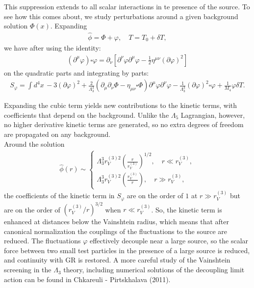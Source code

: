 \documentclass{book}
\theoremstyle{definition}
\newcommand{\p}{\partial}
\newcommand{\f}[2]{\frac{#1}{#2}}
\newcommand{\lp}{\left(}
\newcommand{\rp}{\right)}
\newcommand{\lb}{\left[}
\newcommand{\rb}{\right]}
\begin{document}
This suppression extends to all scalar interactions in te presence of the source. To see how this comes about, we study perturbations around a given background solution $\Phi(x)$. Expanding
\begin{align}
\hat{\phi} = \Phi + \varphi, \quad T = T_0 + \delta T,
\end{align}
we have after using the identity:
\begin{align}
(\p^\mu \varphi)\square \varphi = \p_\nu \lb \p^\nu \varphi \p^\mu \varphi - \f{1}{2} \eta^{\mu\nu}(\p \varphi)^2 \rb
\end{align}
on the quadratic parts and integrating by parts:
\begin{align}
S_\varphi = \int d^4x\, -3(\p \varphi)^2 + \f{2}{\Lambda_3^3}\lp \p_\mu \p_\nu \Phi - \eta_{\mu\nu}\square \Phi \rp\p^\mu \varphi \p^\nu \varphi - \f{1}{\Lambda_3^3}(\p \varphi)^2\square \varphi + \f{1}{M_4}\varphi \delta T.
\end{align}

Expanding the cubic term yields new contributions to the kinetic terms, with coefficients that depend on the background. Unlike the $\Lambda_5$ Lagrangian, however, no higher derivative kinetic terms are generated, so no extra degrees of freedom are propagated on any background.\\

Around the solution 
\begin{align}
\hat{\phi}(r) \sim \begin{cases}
\Lambda_3^3 r_V^{(3)2}\lp \f{r}{r_V^{(3)}}\rp^{1/2},\quad r \ll r_V^{(3)},\\
\Lambda_3^3 r_V^{(3)2}\lp \f{r_V^{(3)}}{r}  \rp,\quad r \gg r_V^{(3)},
\end{cases}
\end{align}
the coefficients of the kinetic term in $S_\varphi$ are on the order of $1$ at $r \gg r_V^{(3)}$ but are on the order of $(r_V^{(3)}/r)^{3/2}$ when $r\ll r_V^{(3)}$. So, the kinetic term is enhanced at distances below the Vainshtein radius, which means that after canonical normalization the couplings of the fluctuations to the source are reduced. The fluctuations $\varphi$ effectively decouple near a large source, so the scalar force between two small test particles in the presence of a large source is reduced, and continuity with GR is restored. A more careful study of the Vainshtein screening in the $\Lambda_3$ theory, including numerical solutions of the decoupling limit action can be found in Chkareuli - Pirtskhalava (2011). 
\end{document}
